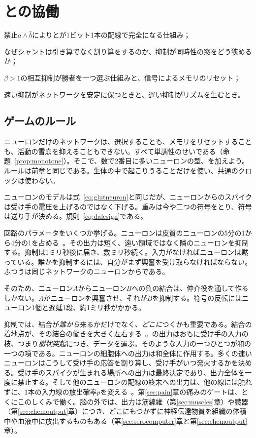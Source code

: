 \chapter{との協働}
\label{sec:gaba}
\begin{chaptergoals}
\item 禁止$a\wedge\bar b$によりとが1ビット1本の配線で完全になる仕組み；
\item なぜシャントは引き算でなく割り算をするのか、抑制が同時性の窓をどう狭めるか；
\item $\beta>1$の相互抑制が勝者を一つ選ぶ仕組みと、信号によるメモリのリセット；
\item 速い抑制がネットワークを安定に保つときと、遅い抑制がリズムを生むとき。
\end{chaptergoals}

\section{ゲームのルール}

ニューロンだけのネットワークは、選択することも、メモリをリセットすることも、活動の雪崩を抑えることもできない。すべて単調性のせいである（命題~\ref{prop:monotone}）。そこで、数で2番目に多いニューロンの型、を加えよう。ルールは前章と同じである。生体の中で起こりうることだけを使い、共通のクロックは使わない。

ニューロンのモデルは式~\eqref{eq:glutneuron}と同じだが、ニューロンからのスパイクは受け手の電圧を上げるのではなく下げる。重みは今や二つの符号をとり、符号は送り手が決める。規則~\eqref{eq:dalesign}である。

回路のパラメータをいくつか挙げる。ニューロンは皮質のニューロンの5分の1から4分の1を占める~\cite{Hendry1987}。その出力は短く、遠い領域ではなく隣のニューロンを抑制する。抑制は1ミリ秒後に届き、数ミリ秒続く。入力がなければニューロンは黙っている。誰かを抑制するには、自分がまず興奮を受け取らなければならない。ふつうは同じネットワークのニューロンからである。

そのため、ニューロン$A$からニューロン$B$への負の結合は、仲介役を通して作るしかない。$A$がニューロンを興奮させ、それが$B$を抑制する。符号の反転にはニューロン1個と遅延1段、約1ミリ秒がかかる。

抑制では、結合が\emph{誰から}来るかだけでなく、\emph{どこに}つくかも重要である。結合の着地点が、その結合の働きを大きく左右する~\cite{Markram2004}。の出力はおもに受け手の入力の枝、つまり\emph{樹状突起}につき、データを運ぶ。そのような入力の一つひとつが和の一つの項である。ニューロンの細胞体への出力は和全体に作用する。多くの速いニューロンはこうして受け手の応答を割り算し、受け手がいつ発火するかを決める。受け手のスパイクが生まれる場所への出力は最終決定であり、出力全体を一度に禁止する。そして他のニューロンの配線の終末への出力は、他の線には触れずに、1本の入力線の放出確率$p$を変える~\cite{Rudomin1999}。第\ref{sec:pain}章の痛みのゲートは、とくにこのしくみで働く。脳の外では、出力は筋線維（第\ref{sec:muscles}章）や臓器（第\ref{sec:chemoutput}章）につき、どこにもつかずに神経伝達物質を組織の体積中や血液中に放出するものもある（第\ref{sec:serocomputer}章と第\ref{sec:chemoutput}章）。

